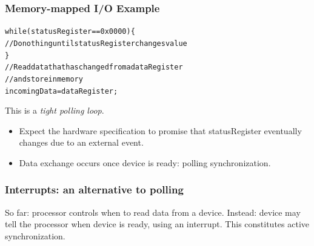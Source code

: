 \begin{frame}
\frametitle{Memory-mapped I/O Example}

\small
\begin{changemargin}{1em}
\begin{alltt}
 while (\alert{statusRegister} == 0x0000) \{\\
 \qquad // Do nothing until statusRegister changes value\\
 \}\\
 //  Read data that has changed from a dataRegister\\
 //  and store in memory\\
 incomingData = \alert{dataRegister};\\
\end{alltt}
\end{changemargin}

\begin{changemargin}{1cm}
This is a \emph{tight polling loop}.\\[1em]
\begin{itemize}
\item Expect the hardware specification to promise that statusRegister eventually changes 
due to an external event.
\item Data exchange occurs once device is ready: \alert{polling synchronization}.
\end{itemize}
\end{changemargin}


\end{frame}

\begin{frame}
\frametitle{Interrupts: an alternative to polling}

\large
\begin{changemargin}{1cm}
So far: processor controls when to read data from a device.\vfill
Instead: device may tell the processor when device is ready,
using an \alert{interrupt}.\vfill
This constitutes \alert{active synchronization}.
\end{changemargin}

\end{frame}

